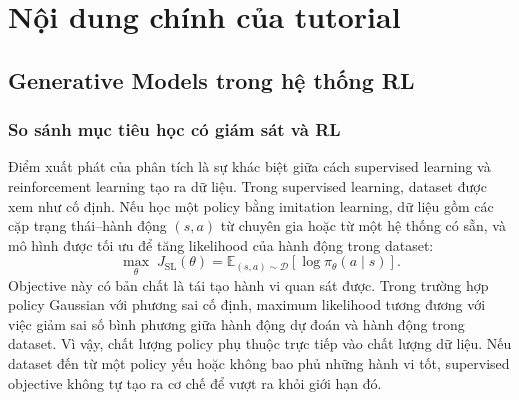 \graphicspath{{images/}{report/images/}}
\setlength{\emergencystretch}{3em}

\section{Nội dung chính của tutorial}



\subsection{Generative Models trong hệ thống RL}

\subsubsection{So sánh mục tiêu học có giám sát và RL}

Điểm xuất phát của phân tích là sự khác biệt giữa cách supervised learning và reinforcement learning tạo ra dữ liệu.
Trong supervised learning, dataset được xem như cố định.
Nếu học một policy bằng imitation learning, dữ liệu gồm các cặp trạng thái--hành động $(s,a)$ từ chuyên gia hoặc từ một hệ thống có sẵn, và mô hình được tối ưu để tăng likelihood của hành động trong dataset:
\begin{equation}
    \max_\theta\;
    J_{\mathrm{SL}}(\theta)
    =
    \mathbb{E}_{(s,a)\sim\mathcal{D}}
    \left[
        \log \pi_\theta(a\mid s)
    \right].
    \label{eq:tv2-sl-objective}
\end{equation}
Objective này có bản chất là tái tạo hành vi quan sát được.
Trong trường hợp policy Gaussian với phương sai cố định, maximum likelihood tương đương với việc giảm sai số bình phương giữa hành động dự đoán và hành động trong dataset.
Vì vậy, chất lượng policy phụ thuộc trực tiếp vào chất lượng dữ liệu.
Nếu dataset đến từ một policy yếu hoặc không bao phủ những hành vi tốt, supervised objective không tự tạo ra cơ chế để vượt ra khỏi giới hạn đó.

